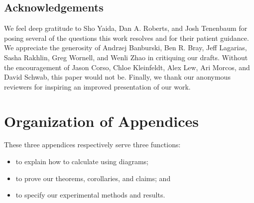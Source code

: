 \documentclass{article}
\theoremstyle{plain}
\theoremstyle{definition}
\begin{document}
\subsection{Acknowledgements}
    We feel deep gratitude to
        Sho Yaida,
        Dan A. Roberts, and
        Josh Tenenbaum
    for posing several of the questions this work resolves and for their
    patient guidance.  We appreciate the generosity of
        Andrzej Banburski,
        Ben R. Bray,
        Jeff Lagarias,
        Sasha Rakhlin,
        Greg Wornell, and
        Wenli Zhao
    in critiquing our drafts.
    Without the encouragement of
        Jason Corso,
        Chloe Kleinfeldt,
        Alex Lew, 
        Ari Morcos, and
        David Schwab,
    this paper would not be.
    Finally, we thank our anonymous reviewers for inspiring an improved
    presentation of our work.


    
    


\clearpage
\newpage
\renewcommand{\thesection}{\Alph{section}}
\setcounter{section}{0}

\section*{Organization of Appendices}
    These three appendices respectively serve three functions:
    \begin{itemize}
        \item to explain how to calculate using diagrams;
        \item to prove our theorems, corollaries, and claims; and
        \item to specify our experimental methods and results.
    \end{itemize}
\end{document}
